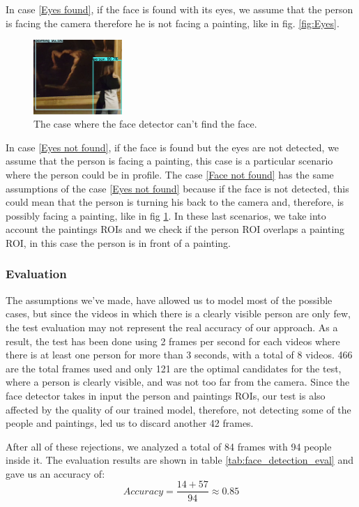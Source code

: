 In case \ref*{Eyes found}, if the face is found with its eyes, we assume that the person is facing the camera therefore he is not facing a painting, like in fig. \ref{fig:Eyes}.
\begin{figure}[h!]
    \centering
    \includegraphics[width=0.3\textwidth]{pictures/face_detection/face_det1}
    \caption{The case where the face detector can't find the face.}
    \label{fig:No_eyes}
\end{figure}
In case \ref*{Eyes not found}, if the face is found but the eyes are not detected, we assume that the person is facing a painting, this case is a particular scenario where the person could be in profile. The case \ref*{Face not found} has the same assumptions of the case \ref*{Eyes not found} because if the face is not detected, this could mean that the person is turning his back to the camera and, therefore, is possibly facing a painting, like in fig \ref{fig:No_eyes}. In these last scenarios, we take into account the paintings ROIs and we check if the person ROI overlaps a painting ROI, in this case the person is in front of a painting.

\subsubsection{Evaluation}
The assumptions we've made, have allowed us to model most of the possible cases, but since the videos in which there is a clearly visible person are only few, the test evaluation may not represent the real accuracy of our approach. As a result, the test has been done using 2 frames per second for each videos where there is at least one person for more than 3 seconds, with a total of 8 videos. 466 are the total frames used and only 121 are the optimal candidates for the test, where a person is clearly visible, and was not too far from the camera. Since the face detector takes in input the person and paintings ROIs, our test is also affected by the quality of our trained model, therefore, not detecting some of the people and paintings, led us to discard another 42 frames.

After all of these rejections, we analyzed a total of 84 frames with 94 people inside it. The evaluation results are shown in table \ref{tab:face_detection_eval} and gave us an accuracy of: \[Accuracy = \frac{14+57}{94} \approx 0.85\]

